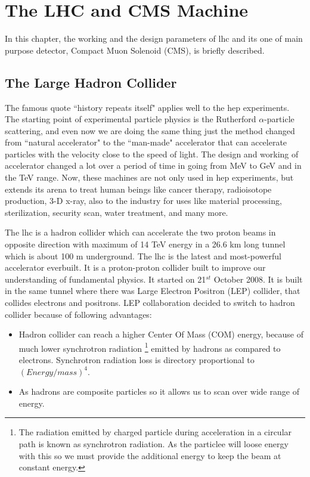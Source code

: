 \chapter{The LHC and CMS Machine} %
\label{cha:the_lhc_and_cms_machine}

In this chapter, the working and the design parameters of \acrfull{lhc} and its one of main purpose detector, Compact Muon Solenoid (CMS), is briefly described.


\section{The Large Hadron Collider} %
\label{sec:the_large_hadron_collider}

The famous quote ``history repeats itself" applies well to the \acrfull{hep} experiments. The starting point of experimental particle physics is the Rutherford $\alpha$-particle scattering, and even now we are doing the same thing just the method changed from ``natural accelerator" to the ``man-made" accelerator that can accelerate particles with the velocity close to the speed of light. The design and working of accelerator changed a lot over a period of time in going from MeV to GeV and in the TeV range. Now, these machines are not only used in \acrshort{hep} experiments, but extends its arena to treat human beings like cancer therapy, radioisotope production, 3-D x-ray, also to the industry for uses like material processing, sterilization, security scan, water treatment, and many more. 

The \acrshort{lhc} is  a hadron collider which can accelerate the two proton beams in opposite direction with maximum of 14 TeV energy in a 26.6 km long tunnel which is about 100 m underground. The \acrshort{lhc} is the latest and most-powerful accelerator everbuilt. It is a proton-proton collider built to improve our understanding of fundamental physics. It started on 21$^{st}$ October 2008. It is built in the same tunnel where there was Large Electron Positron (LEP) collider, that collides electrons and positrons. LEP collaboration decided to switch to hadron collider because of following advantages:
\begin{itemize}
    \item Hadron collider can reach a higher Center Of Mass (COM) energy, because of much lower synchrotron radiation \footnote{The radiation emitted by charged particle during acceleration in a circular path is known as synchrotron radiation. As the particlee will loose energy with this so we must provide the additional energy to keep the beam at constant energy.} emitted by hadrons as compared to electrons. Synchrotron radiation loss is directory proportional to $(Energy/mass)^4$. 
    \item As hadrons are composite particles so it allows us to scan over wide range of energy.
\end{itemize}


